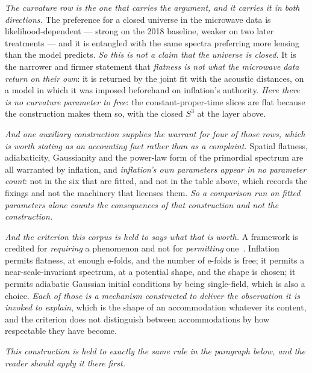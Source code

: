 \documentclass[11pt,a4paper]{article}
\theoremstyle{plain}
\theoremstyle{definition}
\begin{document}
\emph{The curvature row is the one that carries the argument, and it carries it in both directions.} The
preference for a closed universe in the microwave data is likelihood-dependent --- strong on the 2018
baseline, weaker on two later treatments --- and it is entangled with the same spectra preferring more lensing
than the model predicts. \emph{So this is not a claim that the universe is closed.} It is the narrower and
firmer statement that \emph{flatness is not what the microwave data return on their own}: it is returned by
the joint fit with the acoustic distances, on a model in which it was imposed beforehand on inflation's
authority. \emph{Here there is no curvature parameter to free}: the constant-proper-time slices are flat
because the construction makes them so, with the closed $S^3$ at the layer above.

\emph{And one auxiliary construction supplies the warrant for four of those rows, which is worth stating as
an accounting fact rather than as a complaint.} Spatial flatness, adiabaticity, Gaussianity and the
power-law form of the primordial spectrum are all warranted by inflation, and \emph{inflation's own parameters
appear in no parameter count}: not in the six that are fitted, and not in the table above, which records the
fixings and not the machinery that licenses them. \emph{So a comparison run on fitted parameters alone
counts the consequences of that construction and not the construction.}

\emph{And the criterion this corpus is held to says what that is worth.} A framework is credited for
\emph{requiring} a phenomenon and not for \emph{permitting} one~\cite{JanzenShadowExistence}. Inflation
permits flatness, at enough e-folds, and the number of e-folds is free; it permits a near-scale-invariant
spectrum, at a potential shape, and the shape is chosen; it permits adiabatic Gaussian initial conditions by
being single-field, which is also a choice. \emph{Each of those is a mechanism constructed to deliver the
observation it is invoked to explain}, which is the shape of an accommodation whatever its content, and the
criterion does not distinguish between accommodations by how respectable they have become.

\emph{This construction is held to exactly the same rule in the paragraph below, and the reader should apply
it there first.}
\end{document}

